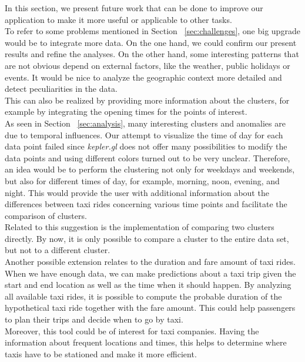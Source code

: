 \documentclass[sigconf, authorversion, nonacm=true]{acmart}
\begin{document}
In this section, we present future work that can be done to improve our application to make it more useful or applicable to other tasks.\\
To refer to some problems mentioned in Section ~\ref{sec:challenges}, one big upgrade would be to integrate more data. On the one hand, we could confirm our present results and refine the analyses. On the other hand, some interesting patterns that are not obvious depend on external factors, like the weather, public holidays or events. It would be nice to analyze the geographic context more detailed and detect peculiarities in the data.\\
This can also be realized by providing more information about the clusters, for example by integrating the opening times for the points of interest.\\


As seen in Section ~\ref{sec:analysis}, many interesting clusters and anomalies are due to temporal influences. Our attempt to visualize the time of day for each data point failed since \textit{kepler.gl} does not offer many possibilities to modify the data points and using different colors turned out to be very unclear. Therefore, an idea would be to perform the clustering not only for weekdays and weekends, but also for different times of day, for example, morning, noon, evening, and night. This would provide the user with additional information about the differences between taxi rides concerning various time points and facilitate the comparison of clusters.\\
Related to this suggestion is the implementation of comparing two clusters directly. By now, it is only possible to compare a cluster to the entire data set, but not to a different cluster. \\




Another possible extension relates to the duration and fare amount of taxi rides. When we have enough data, we can make predictions about a taxi trip given the start and end location as well as the time when it should happen. By analyzing all available taxi rides, it is possible to compute the probable duration of the hypothetical taxi ride together with the fare amount. This could help passengers to plan their trips and decide when to go by taxi.\\
Moreover, this tool could be of interest for taxi companies. Having the information about frequent locations and times, this helps to determine where taxis have to be stationed and make it more efficient.\\
\end{document}

